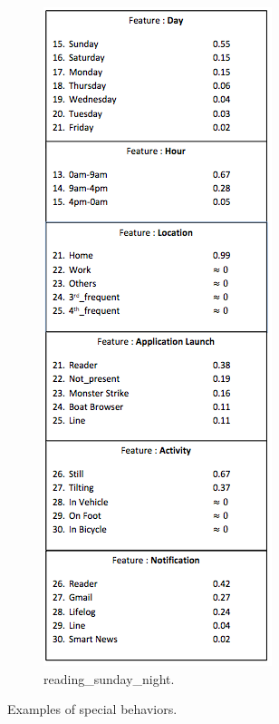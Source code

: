 \begin{figure}[t!]
\begin{subfigure}[t]{0.33\textwidth}
        \includegraphics[scale=0.5]{Figures/sundayReading.png}
        \caption{reading\_sunday\_night.}
\label{readSunday}
    \end{subfigure}
    \caption{Examples of special behaviors.}
\label{specialBehavior}

\end{figure}

